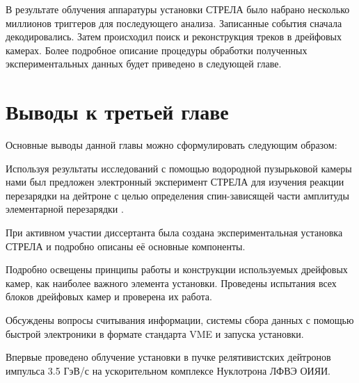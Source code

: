 В результате облучения аппаратуры установки СТРЕЛА было набрано несколько
миллионов триггеров для последующего анализа. Записанные события сначала
декодировались. Затем происходил поиск и реконструкция треков в дрейфовых
камерах. Более подробное описание процедуры обработки  полученных
экспериментальных данных будет приведено в следующей главе.

\section{Выводы к третьей главе}
Основные выводы данной главы можно сформулировать следующим образом:
\begin{list}{}{\leftmargin=1em}
\item Используя результаты исследований с помощью водородной
  пузырьковой камеры нами был предложен электронный эксперимент СТРЕЛА для
  изучения реакции перезарядки на дейтроне \dpchex с целью определения
  спин-зависящей части амплитуды элементарной перезарядки \np.
\item При активном участии диссертанта была создана экспериментальная установка
  СТРЕЛА и подробно описаны её основные компоненты.
\item Подробно освещены принципы работы и конструкции используемых дрейфовых
  камер, как наиболее важного элемента установки. Проведены испытания всех
  блоков дрейфовых камер и проверена их работа.
\item Обсуждены вопросы считывания информации, системы сбора данных с помощью
  быстрой электроники в формате стандарта VME и запуска установки.
\item Впервые проведено \! облучение установки в пучке релятивистских дейтронов
  импульса 3.5 ГэВ/с на ускорительном комплексе Нуклотрона ЛФВЭ ОИЯИ.
\end{list}

